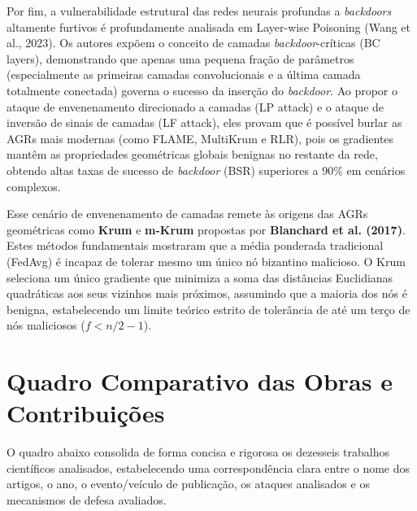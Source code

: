\documentclass[11pt,a4paper]{article}
\begin{document}
Por fim, a vulnerabilidade estrutural das redes neurais profundas a \emph{backdoors} altamente furtivos é profundamente analisada em Layer-wise Poisoning (Wang et al., 2023). Os autores expõem o conceito de camadas \emph{backdoor}-críticas (BC layers), demonstrando que apenas uma pequena fração de parâmetros (especialmente as primeiras camadas convolucionais e a última camada totalmente conectada) governa o sucesso da inserção do \emph{backdoor}. Ao propor o ataque de envenenamento direcionado a camadas (LP attack) e o ataque de inversão de sinais de camadas (LF attack), eles provam que é possível burlar as AGRs mais modernas (como FLAME, MultiKrum e RLR), pois os gradientes mantêm as propriedades geométricas globais benignas no restante da rede, obtendo altas taxas de sucesso de \emph{backdoor} (BSR) superiores a 90\% em cenários complexos.

Esse cenário de envenenamento de camadas remete às origens das AGRs geométricas como \textbf{Krum} e \textbf{m-Krum} propostas por \textbf{Blanchard et al. (2017)}. Estes métodos fundamentais mostraram que a média ponderada tradicional (FedAvg) é incapaz de tolerar mesmo um único nó bizantino malicioso. O Krum seleciona um único gradiente que minimiza a soma das distâncias Euclidianas quadráticas aos seus vizinhos mais próximos, assumindo que a maioria dos nós é benigna, estabelecendo um limite teórico estrito de tolerância de até um terço de nós maliciosos ($f < n/2 - 1$).

\section{Quadro Comparativo das Obras e Contribuições}
O quadro abaixo consolida de forma concisa e rigorosa os dezesseis trabalhos científicos analisados, estabelecendo uma correspondência clara entre o nome dos artigos, o ano, o evento/veículo de publicação, os ataques analisados e os mecanismos de defesa avaliados.

\vspace{0.8em}
\end{document}
